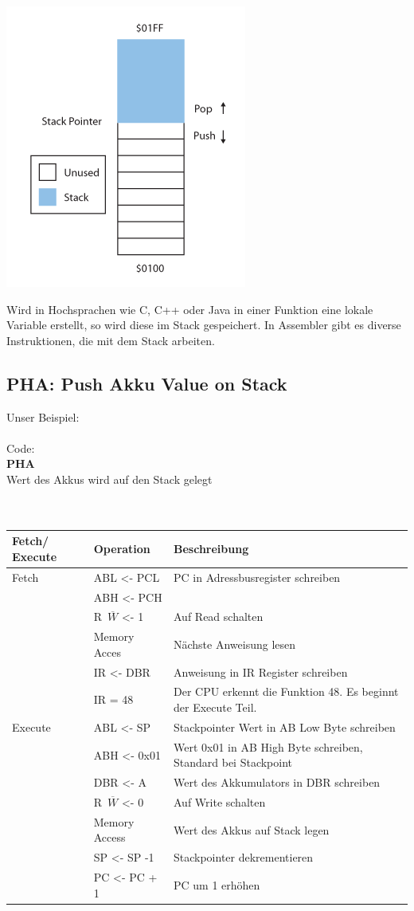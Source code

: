 \documentclass[a4paper,10pt]{report}
\begin{document}
\begin{center}\includegraphics[scale=0.8]{imgs/stack.png}\end{center}

Wird in Hochsprachen wie C, C++ oder Java in einer Funktion eine lokale Variable erstellt, so wird diese im Stack gespeichert. In Assembler gibt es diverse Instruktionen, die mit dem Stack arbeiten.
\subsection{PHA: Push Akku Value on Stack}
Unser Beispiel: \\
\\
Code:\\
\textbf{PHA}
\\
Wert des Akkus wird auf den Stack gelegt\\
\\
\\
\begin{tabularx}{\textwidth}{l|l|X}
Fetch/ Execute & Operation & Beschreibung \\ \hline 
Fetch& ABL <- PCL& PC in Adressbusregister schreiben\\
& ABH <- PCH& \\
&R\ $\overline{W}$ <- 1& Auf Read schalten\\
&Memory Acces& Nächste Anweisung lesen\\
&IR <- DBR& Anweisung in IR Register schreiben\\
&IR = 48 & Der CPU erkennt die Funktion 48. Es beginnt der Execute Teil.\\
Execute&ABL <- SP& Stackpointer Wert in AB Low Byte schreiben\\
&ABH <- 0x01& Wert 0x01 in AB High Byte schreiben, Standard bei Stackpoint\\
&DBR <- A& Wert des Akkumulators in DBR schreiben\\
&R\ $\overline{W}$ <- 0& Auf Write schalten\\
&Memory Access&  Wert des Akkus auf Stack legen\\
&SP <- SP -1& Stackpointer dekrementieren\\
&PC <- PC + 1& PC um 1 erhöhen\\
\end{tabularx}
\end{document}

